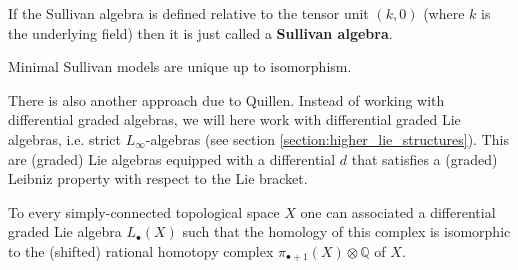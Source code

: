     \begin{remark}
        If the Sullivan algebra is defined relative to the tensor unit $(k, 0)$ (where $k$ is the underlying field) then it is just called a \textbf{Sullivan algebra}.
    \end{remark}

    \begin{property}
        Minimal Sullivan models are unique up to isomorphism.
    \end{property}

    There is also another approach due to Quillen. Instead of working with differential graded algebras, we will here work with differential graded Lie algebras, i.e. strict $L_\infty$-algebras (see section \ref{section:higher_lie_structures}). This are (graded) Lie algebras equipped with a differential $d$ that satisfies a (graded) Leibniz property with respect to the Lie bracket.
    \begin{construct}
        To every simply-connected topological space $X$ one can associated a differential graded Lie algebra $L_\bullet(X)$ such that the homology of this complex is isomorphic to the (shifted) rational homotopy complex $\pi_{\bullet+1}(X)\otimes\mathbb{Q}$ of $X$.
    \end{construct}

